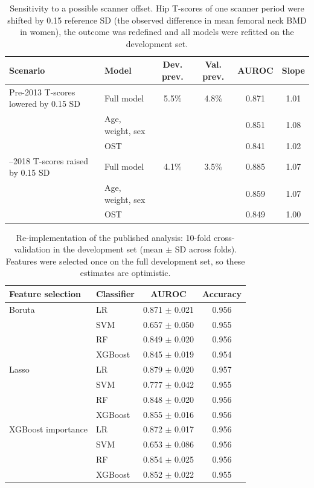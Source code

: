 \documentclass[11pt,a4paper]{article}
\begin{document}
\begin{table}[H]
\centering
\caption{Sensitivity to a possible scanner offset. Hip T-scores of one scanner period were shifted by 0.15 reference SD (the observed difference in mean femoral neck BMD in women), the outcome was redefined and all models were refitted on the development set.}
\label{tab:scanner}
\footnotesize
\begin{tabular}{llcccc}
\toprule
Scenario & Model & Dev. prev. & Val. prev. & AUROC & Slope \\
\midrule
Pre-2013 T-scores lowered by 0.15 SD & Full model & 5.5\% & 4.8\% & 0.871 & 1.01 \\
 & Age, weight, sex & & & 0.851 & 1.08 \\
 & OST & & & 0.841 & 1.02 \\
\addlinespace
2013--2018 T-scores raised by 0.15 SD & Full model & 4.1\% & 3.5\% & 0.885 & 1.07 \\
 & Age, weight, sex & & & 0.859 & 1.07 \\
 & OST & & & 0.849 & 1.00 \\
\bottomrule
\end{tabular}
\end{table}

\begin{table}[H]
\centering
\caption{Re-implementation of the published analysis: 10-fold cross-validation in the development set (mean $\pm$ SD across folds). Features were selected once on the full development set, so these estimates are optimistic.}
\label{tab:reimpl}
\small
\begin{tabular}{llcc}
\toprule
Feature selection & Classifier & AUROC & Accuracy \\
\midrule
Boruta & LR & 0.871 $\pm$ 0.021 & 0.956 \\
 & SVM & 0.657 $\pm$ 0.050 & 0.955 \\
 & RF & 0.849 $\pm$ 0.020 & 0.956 \\
 & XGBoost & 0.845 $\pm$ 0.019 & 0.954 \\
\addlinespace
Lasso & LR & 0.879 $\pm$ 0.020 & 0.957 \\
 & SVM & 0.777 $\pm$ 0.042 & 0.955 \\
 & RF & 0.848 $\pm$ 0.020 & 0.956 \\
 & XGBoost & 0.855 $\pm$ 0.016 & 0.956 \\
\addlinespace
XGBoost importance & LR & 0.872 $\pm$ 0.017 & 0.956 \\
 & SVM & 0.653 $\pm$ 0.086 & 0.956 \\
 & RF & 0.854 $\pm$ 0.025 & 0.956 \\
 & XGBoost & 0.852 $\pm$ 0.022 & 0.955 \\
\bottomrule
\end{tabular}
\end{table}
\end{document}
